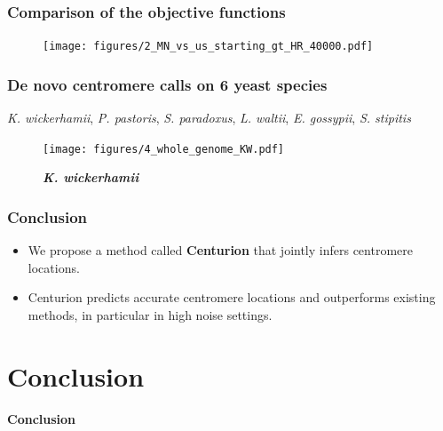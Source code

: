 \documentclass[xcolor=dvipsnames]{beamer}
\begin{document}
\begin{frame}
\frametitle{Comparison of the objective functions}

\begin{figure}
\texttt{[image: figures/2\_MN\_vs\_us\_starting\_gt\_HR\_40000.pdf]}
\end{figure}
\end{frame}

\begin{frame}
\frametitle{De novo centromere calls on 6 yeast species}

\textit{K. wickerhamii}, \textit{P. pastoris}, \textit{S. paradoxus}, \textit{L.
waltii}, \textit{E. gossypii}, \textit{S. stipitis}

\begin{figure}
\texttt{[image: figures/4\_whole\_genome\_KW.pdf]}

\caption{\textbf{\textit{K. wickerhamii}}}
\end{figure}

\end{frame}

\begin{frame}
\frametitle{Conclusion}
\begin{itemize}
\item We propose a method called {\bf Centurion} that jointly infers
centromere locations.
\item Centurion predicts accurate centromere locations and outperforms
existing methods, in particular in high noise settings.
\end{itemize}
\end{frame}


\section{Conclusion}
\begin{frame}
\begin{center}
\huge{ \bf
Conclusion
}
\end{center}
\end{frame}

\end{document}
